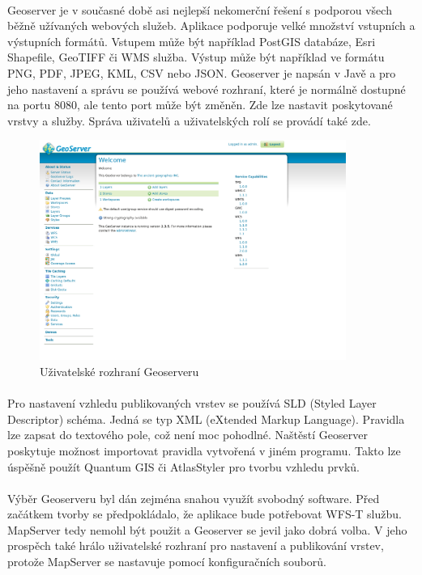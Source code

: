 \documentclass[11pt,a4paper,titlepage,oneside]{book}
\begin{document}
		\paragraph{} Geoserver je v současné době asi nejlepší nekomerční řešení\cite{vorlicek} s  podporou všech běžně užívaných webových služeb. Aplikace podporuje velké množství vstupních a výstupních formátů. Vstupem může být například PostGIS databáze, Esri Shapefile, GeoTIFF či WMS služba. Výstup může být například ve formátu PNG, PDF, JPEG, KML, CSV nebo JSON.  Geoserver je napsán v Javě a pro jeho nastavení a správu se používá webové rozhraní, které je normálně dostupné na portu 8080, ale tento port může být změněn. Zde lze nastavit poskytované vrstvy a služby. Správa uživatelů a uživatelských rolí se provádí také zde. 
		\begin{figure}[!h]
			\begin{center}
				\includegraphics[width=10cm]{obrazky/geoserver.png}
				\caption{Uživatelské rozhraní Geoserveru}
			\end{center}
		\end{figure}
		\paragraph{}Pro nastavení vzhledu publikovaných vrstev se používá SLD (Styled Layer Descriptor) schéma. Jedná se typ XML (eXtended Markup Language). Pravidla lze zapsat do textového pole, což není moc pohodlné. Naštěstí Geoserver poskytuje možnost importovat pravidla  vytvořená v jiném programu. Takto lze úspěšně použít Quantum GIS\cite{qgis} či AtlasStyler\cite{atlas} pro tvorbu vzhledu prvků.
		\paragraph{} Výběr Geoserveru byl dán zejména snahou využít svobodný software. Před začátkem tvorby se předpokládalo, že aplikace bude potřebovat WFS-T službu. MapServer tedy nemohl být použit a Geoserver se jevil jako dobrá volba. V jeho prospěch také hrálo uživatelské rozhraní pro nastavení a publikování vrstev, protože MapServer se nastavuje pomocí konfiguračních souborů.
\end{document}
